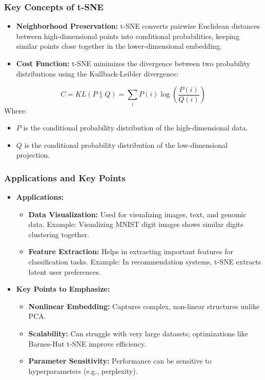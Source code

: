 \documentclass[aspectratio=169]{beamer}
\begin{document}
\begin{frame}[fragile]
    \frametitle{Key Concepts of t-SNE}
    \begin{itemize}
        \item \textbf{Neighborhood Preservation:} 
        t-SNE converts pairwise Euclidean distances between high-dimensional points into conditional probabilities, keeping similar points close together in the lower-dimensional embedding.
        
        \item \textbf{Cost Function:} 
        t-SNE minimizes the divergence between two probability distributions using the Kullback-Leibler divergence:
    \end{itemize}
    \begin{equation}
        C = KL(P \| Q) = \sum_{i} P(i) \log \left( \frac{P(i)}{Q(i)} \right)
    \end{equation}
    Where:
    \begin{itemize}
        \item \(P\) is the conditional probability distribution of the high-dimensional data.
        \item \(Q\) is the conditional probability distribution of the low-dimensional projection.
    \end{itemize}
\end{frame}

\begin{frame}[fragile]
    \frametitle{Applications and Key Points}
    \begin{itemize}
        \item \textbf{Applications:}
        \begin{itemize}
            \item \textbf{Data Visualization:} 
            Used for visualizing images, text, and genomic data. Example: Visualizing MNIST digit images shows similar digits clustering together.
            \item \textbf{Feature Extraction:} 
            Helps in extracting important features for classification tasks. Example: In recommendation systems, t-SNE extracts latent user preferences.
        \end{itemize}

        \item \textbf{Key Points to Emphasize:}
        \begin{itemize}
            \item \textbf{Nonlinear Embedding:} Captures complex, non-linear structures unlike PCA.
            \item \textbf{Scalability:} Can struggle with very large datasets; optimizations like Barnes-Hut t-SNE improve efficiency.
            \item \textbf{Parameter Sensitivity:} Performance can be sensitive to hyperparameters (e.g., perplexity).
        \end{itemize}
    \end{itemize}
\end{frame}
\end{document}
